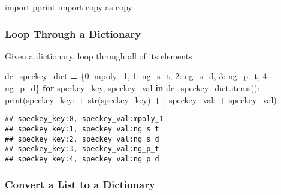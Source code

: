 \documentclass[
]{book}
\newenvironment{Shaded}{\begin{snugshade}}{\end{snugshade}}
\newcommand{\BuiltInTok}[1]{#1}
\newcommand{\ControlFlowTok}[1]{\textcolor[rgb]{0.13,0.29,0.53}{\textbf{#1}}}
\newcommand{\DecValTok}[1]{\textcolor[rgb]{0.00,0.00,0.81}{#1}}
\newcommand{\ImportTok}[1]{#1}
\newcommand{\KeywordTok}[1]{\textcolor[rgb]{0.13,0.29,0.53}{\textbf{#1}}}
\newcommand{\NormalTok}[1]{#1}
\newcommand{\OperatorTok}[1]{\textcolor[rgb]{0.81,0.36,0.00}{\textbf{#1}}}
\newcommand{\StringTok}[1]{\textcolor[rgb]{0.31,0.60,0.02}{#1}}
\begin{document}
\begin{Shaded}
\begin{Highlighting}[]
\ImportTok{import}\NormalTok{ pprint}
\ImportTok{import}\NormalTok{ copy }\ImportTok{as}\NormalTok{ copy}
\end{Highlighting}
\end{Shaded}

\hypertarget{loop-through-a-dictionary}{%
\subsubsection{Loop Through a Dictionary}\label{loop-through-a-dictionary}}

Given a dictionary, loop through all of its elements

\begin{Shaded}
\begin{Highlighting}[]
\NormalTok{dc\_speckey\_dict }\OperatorTok{=}\NormalTok{ \{}\DecValTok{0}\NormalTok{: }\StringTok{\textquotesingle{}mpoly\_1\textquotesingle{}}\NormalTok{,}
                   \DecValTok{1}\NormalTok{: }\StringTok{\textquotesingle{}ng\_s\_t\textquotesingle{}}\NormalTok{,}
                   \DecValTok{2}\NormalTok{: }\StringTok{\textquotesingle{}ng\_s\_d\textquotesingle{}}\NormalTok{,}
                   \DecValTok{3}\NormalTok{: }\StringTok{\textquotesingle{}ng\_p\_t\textquotesingle{}}\NormalTok{,}
                   \DecValTok{4}\NormalTok{: }\StringTok{\textquotesingle{}ng\_p\_d\textquotesingle{}}\NormalTok{\}}
\ControlFlowTok{for}\NormalTok{ speckey\_key, speckey\_val }\KeywordTok{in}\NormalTok{ dc\_speckey\_dict.items():}
    \BuiltInTok{print}\NormalTok{(}\StringTok{\textquotesingle{}speckey\_key:\textquotesingle{}} \OperatorTok{+} \BuiltInTok{str}\NormalTok{(speckey\_key) }\OperatorTok{+} \StringTok{\textquotesingle{}, speckey\_val:\textquotesingle{}} \OperatorTok{+}\NormalTok{ speckey\_val)}
\end{Highlighting}
\end{Shaded}

\begin{verbatim}
## speckey_key:0, speckey_val:mpoly_1
## speckey_key:1, speckey_val:ng_s_t
## speckey_key:2, speckey_val:ng_s_d
## speckey_key:3, speckey_val:ng_p_t
## speckey_key:4, speckey_val:ng_p_d
\end{verbatim}

\hypertarget{convert-a-list-to-a-dictionary}{%
\subsubsection{Convert a List to a Dictionary}\label{convert-a-list-to-a-dictionary}}
\end{document}
